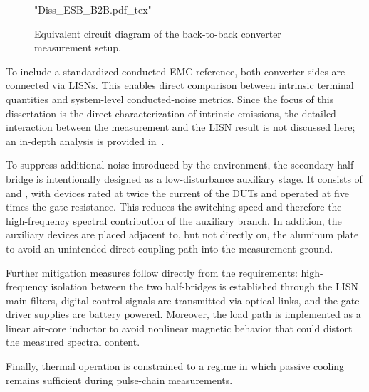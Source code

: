 \begin{figure}[ht]
	\centering
	{"Diss_ESB_B2B.pdf_tex"}
	\caption{Equivalent circuit diagram of the back-to-back converter measurement setup.}\label{fig:ESB_b2b}
\end{figure}



To include a standardized conducted-EMC reference, both converter sides are connected via LISNs.
This enables direct comparison between intrinsic terminal quantities and system-level conducted-noise metrics.
Since the focus of this dissertation is the direct characterization of intrinsic emissions, the detailed interaction between the  measurement and the LISN result is not discussed here; an in-depth analysis is provided in~\cite{kragl_impact_2024}.


To suppress additional noise introduced by the environment, the secondary half-bridge is intentionally designed as a low-disturbance auxiliary stage.
It consists of  and , with devices rated at twice the current of the DUTs and operated at five times the gate resistance.
This reduces the switching speed and therefore the high-frequency spectral contribution of the auxiliary branch.
In addition, the auxiliary devices are placed adjacent to, but not directly on, the aluminum plate to avoid an unintended direct coupling path into the measurement ground.

Further mitigation measures follow directly from the requirements: high-frequency isolation between the two half-bridges is established through the LISN main filters, digital control signals are transmitted via optical links, and the gate-driver supplies are battery powered.
Moreover, the load path is implemented as a linear air-core inductor to avoid nonlinear magnetic behavior that could distort the measured spectral content.

Finally, thermal operation is constrained to a regime in which passive cooling remains sufficient during pulse-chain measurements.

